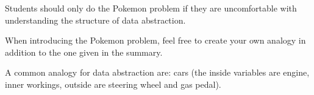    \begin{questionmeta}
        Students should only do the Pokemon problem if they are uncomfortable with understanding the structure of data abstraction.

        When introducing the Pokemon problem, feel free to create your own analogy in addition to the one given in the summary.

        A common analogy for data abstraction are: cars (the inside variables are engine, inner workings, outside are steering wheel and gas pedal).
    \end{questionmeta}